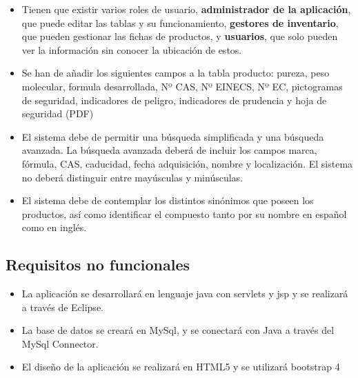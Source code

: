 \begin{itemize}

\item Tienen que existir varios roles de usuario, \textbf{administrador de la aplicación}, que puede editar las tablas y su funcionamiento, \textbf{gestores de inventario}, que pueden gestionar las fichas de productos, y \textbf{usuarios}, que solo pueden ver la información sin conocer la ubicación de estos.  

\item Se han de añadir los siguientes campos a la tabla producto: pureza, peso molecular, formula desarrollada, Nº CAS, Nº EINECS, Nº EC, pictogramas de seguridad, indicadores de peligro, indicadores de prudencia y hoja de seguridad (PDF)

\item El sistema debe de permitir una búsqueda simplificada y una búsqueda avanzada. La búsqueda avanzada deberá de incluir los campos marca, fórmula, CAS, caducidad, fecha adquisición, nombre y localización. El sistema no deberá distinguir entre mayúsculas y minúsculas.

\item El sistema debe de contemplar los distintos sinónimos que poseen los productos, así como identificar el compuesto tanto por su nombre en español como en inglés.
  
\end{itemize}

\subsection{Requisitos no funcionales}

\begin{itemize}

\item La aplicación se desarrollará en lenguaje java con servlets y jsp y se realizará a través de Eclipse.

\item La base de datos se creará en MySql, y se conectará con Java a través del MySql Connector.

\item El diseño de la aplicación se realizará en HTML5 y se utilizará bootstrap 4 

\end{itemize}

